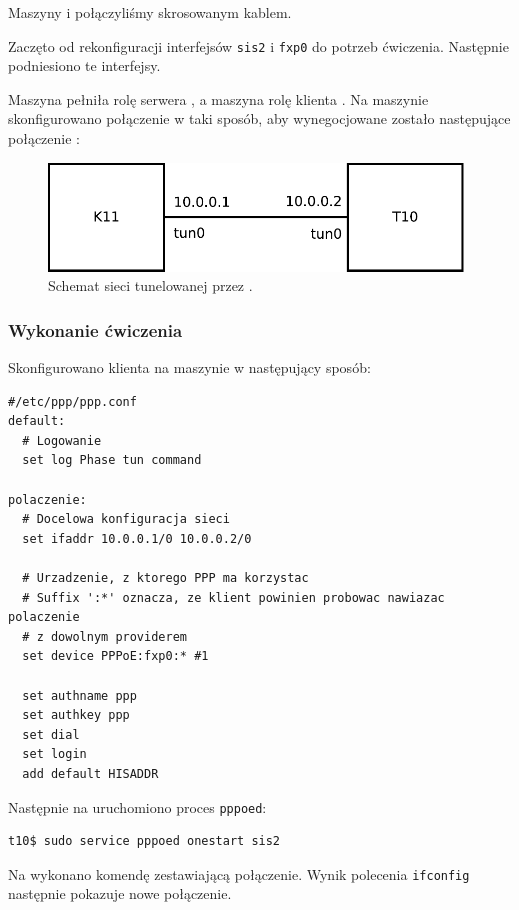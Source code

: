 Maszyny \pppcli{} i \pppserv{} połączyliśmy skrosowanym kablem.

Zaczęto od rekonfiguracji interfejsów \texttt{sis2} i \texttt{fxp0} do potrzeb
ćwiczenia. Następnie podniesiono te interfejsy.

Maszyna \pppserv{} pełniła rolę serwera \ppp, a maszyna \pppcli{} rolę klienta
\ppp. Na maszynie \pppcli{} skonfigurowano połączenie w taki sposób, aby
wynegocjowane zostało następujące połączenie \tcp{}:

\begin{figure}[h!]
  \centering
  \includegraphics[width=11cm]{figury/ppp/schemat-po.pdf}
  \caption{Schemat sieci tunelowanej przez \ppp.}
  \label{fig:ppp:schemat-sieci-po}
\end{figure}


\subsubsection{Wykonanie ćwiczenia}

Skonfigurowano klienta \ppp{} na maszynie \pppcli{} w następujący sposób:

\begin{lstlisting}
#/etc/ppp/ppp.conf
default:
  # Logowanie
  set log Phase tun command

polaczenie:
  # Docelowa konfiguracja sieci
  set ifaddr 10.0.0.1/0 10.0.0.2/0

  # Urzadzenie, z ktorego PPP ma korzystac
  # Suffix ':*' oznacza, ze klient powinien probowac nawiazac polaczenie
  # z dowolnym providerem
  set device PPPoE:fxp0:* #1

  set authname ppp
  set authkey ppp
  set dial
  set login
  add default HISADDR
\end{lstlisting}

Następnie na \pppserv{} uruchomiono proces \texttt{pppoed}:

\begin{lstlisting}
t10$ sudo service pppoed onestart sis2
\end{lstlisting}

Na \pppcli{} wykonano komendę zestawiającą połączenie. Wynik polecenia
\texttt{ifconfig} następnie pokazuje nowe połączenie.

